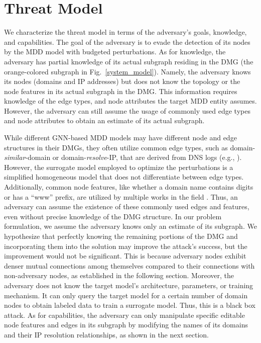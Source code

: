 \documentclass[conference,compsoc]{IEEEtran}
\begin{document}
\section{Threat Model}
\label{Section3}

\par We characterize the threat model in terms of the adversary’s goals, knowledge, and capabilities. The goal of the adversary is to evade the detection of its nodes by the MDD model with budgeted perturbations. As for knowledge, the adversary has partial knowledge of its actual subgraph residing in the DMG (the orange-colored subgraph in Fig.~\ref{system_model}). Namely, the adversary knows its nodes (domains and IP addresses) but does not know the topology or the node features in its actual subgraph in the DMG. This information requires knowledge of the edge types, and node attributes the target MDD entity assumes. However, the adversary can still assume the usage of commonly used edge types and node attributes to obtain an estimate of its actual subgraph. 

While different GNN-based MDD models may have different node and edge structures in their DMGs, they often utilize common edge types, such as domain-\textit{similar}-domain or domain-\textit{resolve}-IP, that are derived from DNS logs (e.g., \cite{sun2019hindom,sun2020deepdom,sun2020hgdom,zhang2021attributed,li2022heterogeneous,wang2022handom}). However, the surrogate model employed to optimize the perturbations is a simplified homogeneous model that does not differentiate between edge types. Additionally, common node features, like whether a domain name contains digits or has a ``www'' prefix, are utilized by multiple works in the field \cite{sun2020deepdom,sun2020hgdom, zhang2021attributed,li2022heterogeneous, wang2022handom}. Thus, an adversary can assume the existence of these commonly used edges and features, even without precise knowledge of the DMG structure. In our problem formulation, we assume the adversary knows only an estimate of its subgraph. We hypothesize that perfectly knowing the remaining portions of the DMG and incorporating them into the solution may improve the attack's success, but the improvement would not be significant. This is because adversary nodes exhibit denser mutual connections among themselves compared to their connections with non-adversary nodes, as established in the following section.
Moreover, the adversary does not know the target model's architecture, parameters, or training mechanism. It can only query the target model for a certain number of domain nodes to obtain labeled data to train a surrogate model. Thus, this is a black box attack. As for capabilities, the adversary can only manipulate specific editable node features and edges in its subgraph by modifying the names of its domains and their IP resolution relationships, as shown in the next section. 
\end{document}
